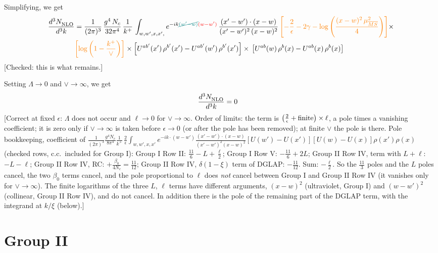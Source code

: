 \documentclass[9pt]{article}
\numberwithin{equation}{section}
\begin{document}
Simplifying, we get
\begin{align}
     \frac{d^{3}N_{\rm NLO}^{\rm}}{d^{3}k} &  =  \frac{1}{(2\pi)^{3}}\, \frac{g^{4}\,N_{c}}{32\pi^{4}}\,\frac{1}{k^{+}}\, \int_{w, w',x,x',} e^{-ik{\color{teal}\cancel{(w^\prime-w)}}{\color{red}(w-w^\prime)}}\, \frac{(x'-w')\cdot (x-w)}{(x'-w')^{2}\, (x-w)^{2}}\, {\color{orange}\left[-\frac{2}{\epsilon}-2\gamma-\log{\left(\frac{(x-w)^{2}\,\mu^{2}_{\overline{MS}}}{4}\right)}\right]}\times \notag \\ & {\color{orange}\left[\log{\left(1-\frac{k^{+}}{\vee}\right)}\right]}\times\left[U^{ab'}(x')\,\rho^{b'}(x') - U^{ab'}(w')\,\rho^{b'}(x')\right]\times\,\left[U^{ab}(w)\,\rho^{b}(x) - U^{ab}(x)\,\rho^{b}(x)\right]
\end{align} {\color{red}[Checked: this is what remains.]}\par\noindent     
Setting $\Lambda \to 0$ and $\vee \to \infty$, we get
\begin{align}
\frac{d^{3}N_{\rm NLO}^{\rm}}{d^{3}k}  & = 0
\end{align} {\color{red}[Correct at fixed $\epsilon$: $\Lambda$ does not occur and $\ell\to0$ for $\vee\to\infty$. Order of limits: the term is $\big(\frac{2}{\epsilon}+{\rm finite}\big)\times\ell$, a pole times a vanishing coefficient; it is zero only if $\vee\to\infty$ is taken before $\epsilon\to0$ (or after the pole has been removed); at finite $\vee$ the pole is there. Pole bookkeeping, coefficient of $\frac{1}{(2\pi)^{3}}\frac{g^{4}N_{c}}{8\pi^{4}}\frac{1}{k^{+}}\,\frac{2}{\epsilon}\int_{w,w',x,x'}e^{-ik\cdot(w-w')}\frac{(x'-w')\cdot(x-w)}{(x'-w')^{2}(x-w)^{2}}[U(w')-U(x')][U(w)-U(x)]\rho(x')\rho(x)$ (checked rows, c.c.\ included for Group I): Group I Row II: $\frac{11}{6}-L+\frac{\ell}{2}$; Group I Row V: $-\frac{11}{6}+2L$; Group II Row IV, term with $L+\ell$: $-L-\ell$; Group II Row IV, RC: $+\frac{\beta_{0}}{4N_{c}}=\frac{11}{12}$; Group II Row IV, $\delta(1-\xi)$ term of DGLAP: $-\frac{11}{12}$. Sum: $-\frac{\ell}{2}$. So the $\frac{11}{3}$ poles and the $L$ poles cancel, the two $\beta_{0}$ terms cancel, and the pole proportional to $\ell$ does \emph{not} cancel between Group I and Group II Row IV (it vanishes only for $\vee\to\infty$). The finite logarithms of the three $L$, $\ell$ terms have different arguments, $(x-w)^{2}$ (ultraviolet, Group I) and $(w-w')^{2}$ (collinear, Group II Row IV), and do not cancel. In addition there is the pole of the remaining part of the DGLAP term, with the integrand at $k/\xi$ (below).]}\par\noindent
\section{Group II}
\end{document}
